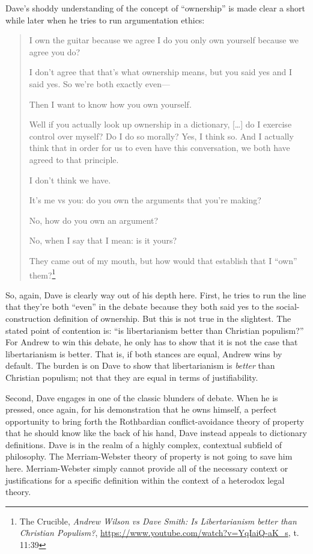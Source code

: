 \documentclass[11pt]{article}
\begin{document}
Dave's shoddy understanding of the concept of ``ownership'' is made clear a short while later when he tries to run argumentation ethics:
\begin{quote}
I own the guitar because we agree I do you only own yourself because we agree you do?

I don't agree that that's what ownership means, but you said yes and I said yes. So we're both exactly even---

Then I want to know how you own yourself.

Well if you actually look up ownership in a dictionary, [\ldots{}] do I exercise control over myself? Do I do so morally? Yes, I think so. And I actually think that in order for us to even have this conversation, we both have agreed to that principle.

I don't think we have.

It's me vs you: do you own the arguments that you're making?

No, how do you own an argument?

No, when I say that I mean: is it yours?

They came out of my mouth, but how would that establish that I ``own'' them?\footnote{The Crucible, \emph{Andrew Wilson vs Dave Smith: Is Libertarianism better than Christian Populism?}, \url{https://www.youtube.com/watch?v=YqIaiQ-aK\_s}, t. 11:39}
\end{quote}

So, again, Dave is clearly way out of his depth here. First, he tries to run the line that they're both ``even'' in the debate because they both said yes to the social-construction definition of ownership. But this is not true in the slightest. The stated point of contention is: ``is libertarianism better than Christian populism?'' For Andrew to win this debate, he only has to show that it is not the case that libertarianism is better. That is, if both stances are equal, Andrew wins by default. The burden is on Dave to show that libertarianism is \emph{better} than Christian populism; not that they are equal in terms of justifiability.

Second, Dave engages in one of the classic blunders of debate. When he is pressed, once again, for his demonstration that he owns himself, a perfect opportunity to bring forth the Rothbardian conflict-avoidance theory of property that he should know like the back of his hand, Dave instead appeals to dictionary definitions. Dave is in the realm of a highly complex, contextual subfield of philosophy. The Merriam-Webster theory of property is not going to save him here. Merriam-Webster simply cannot provide all of the necessary context or justifications for a specific definition within the context of a heterodox legal theory.
\end{document}
